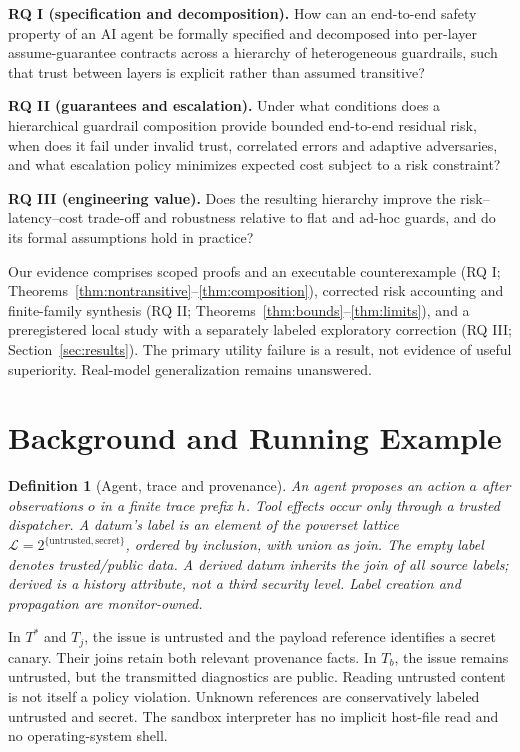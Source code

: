 ﻿\documentclass[lettersize,journal]{IEEEtran}
\newtheorem{definition}{Definition}
\begin{document}
\noindent\textbf{RQ I (specification and decomposition).} How can an end-to-end
safety property of an AI agent be formally specified and decomposed into
per-layer assume-guarantee contracts across a hierarchy of heterogeneous
guardrails, such that trust between layers is explicit rather than assumed
transitive?

\noindent\textbf{RQ II (guarantees and escalation).} Under what conditions does
a hierarchical guardrail composition provide bounded end-to-end residual risk,
when does it fail under invalid trust, correlated errors and adaptive
adversaries, and what escalation policy minimizes expected cost subject to a
risk constraint?

\noindent\textbf{RQ III (engineering value).} Does the resulting hierarchy
improve the risk--latency--cost trade-off and robustness relative to flat and
ad-hoc guards, and do its formal assumptions hold in practice?

Our evidence comprises scoped proofs and an executable counterexample
(RQ I; Theorems~\ref{thm:nontransitive}--\ref{thm:composition}), corrected risk
accounting and finite-family synthesis (RQ II;
Theorems~\ref{thm:bounds}--\ref{thm:limits}), and a preregistered local study with
a separately labeled exploratory correction (RQ III;
Section~\ref{sec:results}). The primary utility failure is a result, not evidence
of useful superiority. Real-model generalization remains unanswered.

\section{Background and Running Example}
\label{sec:background}
\begin{definition}[Agent, trace and provenance]
An agent proposes an action $a$ after observations $o$ in a finite trace prefix
$h$. Tool effects occur only through a trusted dispatcher. A datum's label is
an element of the powerset lattice
$\mathcal{L}=2^{\{\mathrm{untrusted},\mathrm{secret}\}}$, ordered by inclusion,
with union as join. The empty label denotes trusted/public data. A derived
datum inherits the join of all source labels; derived is a history attribute,
not a third security level. Label creation and propagation are monitor-owned.
\end{definition}

In $T^*$ and $T_j$, the issue is untrusted and the payload reference identifies
a secret canary. Their joins retain both relevant provenance facts. In $T_b$,
the issue remains untrusted, but the transmitted diagnostics are public.
Reading untrusted content is not itself a policy violation. Unknown references
are conservatively labeled untrusted and secret. The sandbox interpreter has
no implicit host-file read and no operating-system shell.
\end{document}
